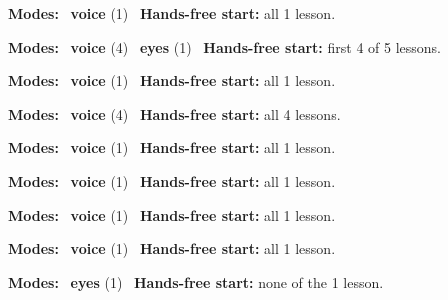 \expandafter\def\csname hlchaptermodality33\endcsname{%
  {\small\noindent
    \textbf{Modes:} \hlvoicesign{}~\textbf{voice} (1)\quad
    \hlvoicesign{}~\textbf{Hands-free start:} all 1 lesson.%
    \par}\medskip
}

\expandafter\def\csname hlchaptermodality34\endcsname{%
  {\small\noindent
    \textbf{Modes:} \hlvoicesign{}~\textbf{voice} (4) \quad \hlsightsign{}~\textbf{eyes} (1)\quad
    \hlvoicesign{}~\textbf{Hands-free start:} first 4 of 5 lessons.%
    \par}\medskip
}

\expandafter\def\csname hlchaptermodality35\endcsname{%
  {\small\noindent
    \textbf{Modes:} \hlvoicesign{}~\textbf{voice} (1)\quad
    \hlvoicesign{}~\textbf{Hands-free start:} all 1 lesson.%
    \par}\medskip
}

\expandafter\def\csname hlchaptermodality36\endcsname{%
  {\small\noindent
    \textbf{Modes:} \hlvoicesign{}~\textbf{voice} (4)\quad
    \hlvoicesign{}~\textbf{Hands-free start:} all 4 lessons.%
    \par}\medskip
}

\expandafter\def\csname hlchaptermodality37\endcsname{%
  {\small\noindent
    \textbf{Modes:} \hlvoicesign{}~\textbf{voice} (1)\quad
    \hlvoicesign{}~\textbf{Hands-free start:} all 1 lesson.%
    \par}\medskip
}

\expandafter\def\csname hlchaptermodality38\endcsname{%
  {\small\noindent
    \textbf{Modes:} \hlvoicesign{}~\textbf{voice} (1)\quad
    \hlvoicesign{}~\textbf{Hands-free start:} all 1 lesson.%
    \par}\medskip
}

\expandafter\def\csname hlchaptermodality39\endcsname{%
  {\small\noindent
    \textbf{Modes:} \hlvoicesign{}~\textbf{voice} (1)\quad
    \hlvoicesign{}~\textbf{Hands-free start:} all 1 lesson.%
    \par}\medskip
}

\expandafter\def\csname hlchaptermodality40\endcsname{%
  {\small\noindent
    \textbf{Modes:} \hlvoicesign{}~\textbf{voice} (1)\quad
    \hlvoicesign{}~\textbf{Hands-free start:} all 1 lesson.%
    \par}\medskip
}

\expandafter\def\csname hlchaptermodality41\endcsname{%
  {\small\noindent
    \textbf{Modes:} \hlsightsign{}~\textbf{eyes} (1)\quad
    \hlvoicesign{}~\textbf{Hands-free start:} none of the 1 lesson.%
    \par}\medskip
}

